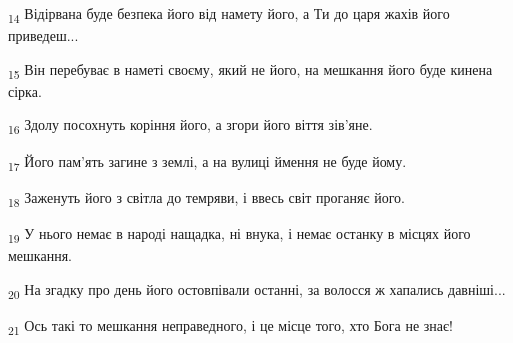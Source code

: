 \begin{tcolorbox}
\textsubscript{14} Відірвана буде безпека його від намету його, а Ти до царя жахів його приведеш...
\end{tcolorbox}
\begin{tcolorbox}
\textsubscript{15} Він перебуває в наметі своєму, який не його, на мешкання його буде кинена сірка.
\end{tcolorbox}
\begin{tcolorbox}
\textsubscript{16} Здолу посохнуть коріння його, а згори його віття зів'яне.
\end{tcolorbox}
\begin{tcolorbox}
\textsubscript{17} Його пам'ять загине з землі, а на вулиці ймення не буде йому.
\end{tcolorbox}
\begin{tcolorbox}
\textsubscript{18} Заженуть його з світла до темряви, і ввесь світ проганяє його.
\end{tcolorbox}
\begin{tcolorbox}
\textsubscript{19} У нього немає в народі нащадка, ні внука, і немає останку в місцях його мешкання.
\end{tcolorbox}
\begin{tcolorbox}
\textsubscript{20} На згадку про день його остовпівали останні, за волосся ж хапались давніші...
\end{tcolorbox}
\begin{tcolorbox}
\textsubscript{21} Ось такі то мешкання неправедного, і це місце того, хто Бога не знає!
\end{tcolorbox}
